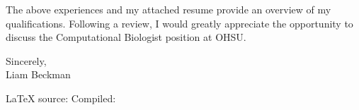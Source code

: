 \vspace*{\baselineskip}

The above experiences and my attached resume provide an overview of my qualifications. Following a review, I would greatly appreciate the opportunity to discuss the Computational Biologist position at OHSU.

\vspace*{2\baselineskip}

Sincerely,\\

Liam Beckman

\vfill \myBreak{}
\textcolor{my-red}{\LaTeX{} source:} 
\hfill
\textcolor{my-red}{Compiled:} 

